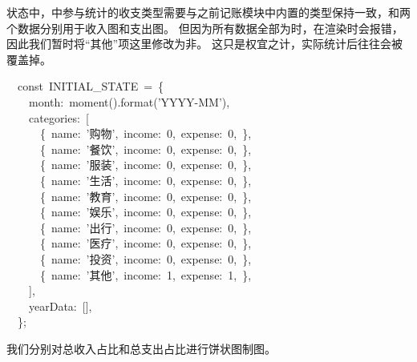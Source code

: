 \documentclass{article}
\begin{document}
状态中，中参与统计的收支类型需要与之前记账模块中内置的类型保持一致，和两个数据分别用于收入图和支出图。
但因为所有数据全部为时，在渲染时会报错，因此我们暂时将“其他”项这里修改为非。
这只是权宜之计，实际统计后往往会被覆盖掉。%
\begin{mdpre}%
\noindent~~{const}~INITIAL\_STATE~=~\{\\
~~~~month:~moment().format({'}{YYYY-MM}{'}),\\
~~~~categories:~{}[\\
~~~~~~\{~name:~{'}{购物}{'},~income:~{0},~expense:~{0},~\},\\
~~~~~~\{~name:~{'}{餐饮}{'},~income:~{0},~expense:~{0},~\},\\
~~~~~~\{~name:~{'}{服装}{'},~income:~{0},~expense:~{0},~\},\\
~~~~~~\{~name:~{'}{生活}{'},~income:~{0},~expense:~{0},~\},\\
~~~~~~\{~name:~{'}{教育}{'},~income:~{0},~expense:~{0},~\},\\
~~~~~~\{~name:~{'}{娱乐}{'},~income:~{0},~expense:~{0},~\},\\
~~~~~~\{~name:~{'}{出行}{'},~income:~{0},~expense:~{0},~\},\\
~~~~~~\{~name:~{'}{医疗}{'},~income:~{0},~expense:~{0},~\},\\
~~~~~~\{~name:~{'}{投资}{'},~income:~{0},~expense:~{0},~\},\\
~~~~~~\{~name:~{'}{其他}{'},~income:~{1},~expense:~{1},~\},\\
~~~~],\\
~~~~yearData:~{}[],\\
~~\};%
\end{mdpre}\noindent{}我们分别对总收入占比和总支出占比进行饼状图制图。
\end{document}
